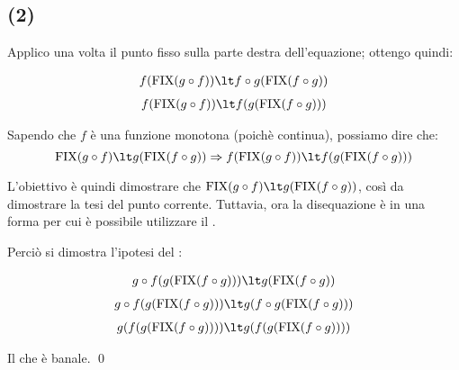 \subsection{(2)}

Applico una volta il punto fisso sulla parte destra dell'equazione; ottengo
quindi:

\begin{align*}
f(\fixp{g \circ f}) \lt f \circ g(\fixp{f \circ g})
\end{align*}
\begin{align*}
f(\fixp{g \circ f}) \lt f(g(\fixp{f \circ g}))
\end{align*}

Sapendo che $f$ è una funzione monotona (poichè continua), possiamo dire che:
$$
\fixp{g \circ f} \lt g(\fixp{f \circ g})
\Rightarrow
f(\fixp{g \circ f}) \lt f(g(\fixp{f \circ g}))
$$

L'obiettivo è quindi dimostrare che $\fixp{g \circ f} \lt g(\fixp{f \circ g})$,
così da dimostrare la tesi del punto corrente. Tuttavia, ora la disequazione è
in una forma per cui è possibile utilizzare il \FPIL.

Perciò si dimostra l'ipotesi del \FPIL:

\begin{align*}
g \circ f(g(\fixp{f \circ g})) \lt g(\fixp{f \circ g})
\end{align*}
\begin{align*}
g \circ f(g(\fixp{f \circ g})) \lt g(f \circ g(\fixp{f \circ g}))
\end{align*}
\begin{align*}
g(f(g(\fixp{f \circ g}))) \lt g(f(g(\fixp{f \circ g})))
\end{align*}

Il che è banale. \qed

\let\lt\undefined
{}
